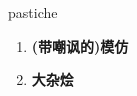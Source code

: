 
\begin{frame}
{\huge pastiche}
\begin{center}
\begin{enumerate}\Large
  \item \textbf{(带嘲讽的)模仿}
  \item \textbf{大杂烩}
\end{enumerate}
\end{center}
\end{frame}
